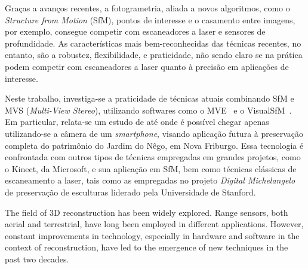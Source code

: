 \documentclass[a4paper,12pt,oneside,onecolumn,final,fleqn]{repUERJ}
\theoremstyle{plain}
\theoremstyle{definition}
\newcounter{ct}
\begin{document}
Graças a avanços recentes, a fotogrametria, aliada a novos algoritmos,
como o \emph{Structure from Motion} (SfM), pontos de interesse e o casamento entre
imagens, por exemplo, consegue competir com escaneadores a laser e sensores de
profundidade. As características mais bem-reconhecidas das técnicas recentes, no
entanto, são a robustez, flexibilidade, e praticidade, não sendo claro se na prática podem 
competir com escaneadores a laser quanto à precisão em aplicações de interesse.

Neste trabalho, investiga-se a praticidade de técnicas atuais combinando SfM e MVS
(\emph{Multi-View Stereo}), utilizando softwares como o MVE~\cite{mve} e
o VisualSfM~\cite{wu2011visualsfm}. Em particular, relata-se um estudo de até
onde é possível chegar apenas utilizando-se a câmera de um \emph{smartphone}, visando
aplicação futura à preservação completa do patrimônio do Jardim do Nêgo, em Nova Friburgo.
Essa tecnologia é confrontada com outros tipos de técnicas empregadas em
grandes projetos, como o Kinect, da Microsoft, e sua aplicação em SfM, bem como técnicas clássicas de 
escaneamento a laser, tais como as empregadas no projeto \emph{Digital Michelangelo} de preservação de
esculturas liderado pela Universidade de Stanford.





\imprimirchaves




The field of 3D reconstruction has been widely explored. Range sensors, both aerial
and terrestrial, have long been employed in different applications. However, constant
improvements in technology, especially in hardware and software in the context
of reconstruction, have led to the emergence of new techniques in the past two decades.
\end{document}
